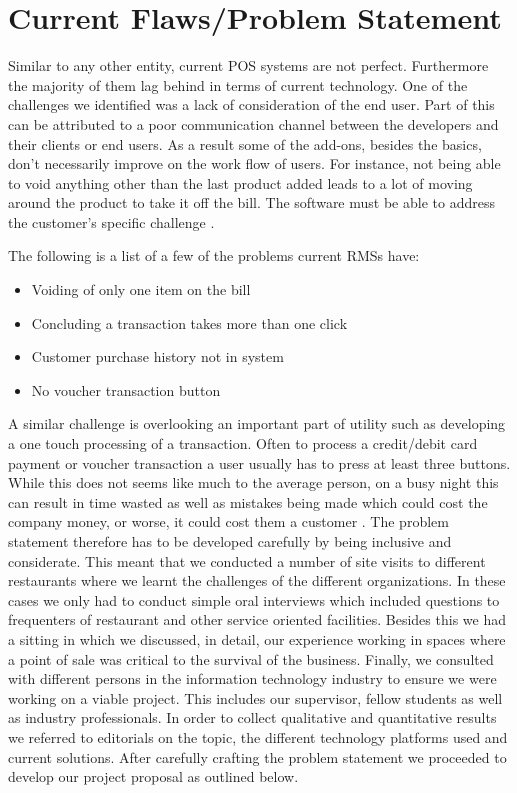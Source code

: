 \section{Current Flaws/Problem Statement}

Similar to any other entity, current POS systems are not perfect. Furthermore the majority of them lag behind in terms of current technology. One of the challenges we identified was a lack of consideration of the end user. Part of this can be attributed to a poor communication channel between the developers and their clients or end users. As a result some of the add-ons, besides the basics, don’t necessarily improve on the work flow of users. For instance, not being able to void anything other than the last product added leads to a lot of moving around the product to take it off the bill. The software must be able to address the customer’s specific challenge \cite{UserExp}. \par

The following is a list of a few of the problems current RMSs have:

\begin{itemize}
  \item Voiding of only one item on the bill
  \item Concluding a transaction takes more than one click
  \item Customer purchase history not in system
  \item No voucher transaction button
\end{itemize}


A similar challenge is overlooking an important part of utility such as developing a one touch processing of a transaction. Often to process a credit/debit card payment or voucher transaction a user usually has to press at least three buttons. While this does not seems like much to the average person, on a busy night this can result in time wasted as well as mistakes being made which could cost the company money, or worse, it could cost them a customer \cite{IIE}.
\newline
\newline
The problem statement therefore has to be developed carefully by being inclusive and considerate. This meant that we conducted a number of site visits to different restaurants where we learnt the challenges of the different organizations. In these cases we only had to conduct simple oral interviews which included questions to frequenters of restaurant and other service oriented facilities. Besides this we had a sitting in which we discussed, in detail, our experience working in spaces where a point of sale was critical to the survival of the business.  
\newline
\newline
Finally, we consulted with different persons in the information technology industry to ensure we were working on a viable project. This includes our supervisor, fellow students as well as industry professionals. In order to collect qualitative and quantitative results we referred to editorials on the topic, the different technology platforms used and current solutions. After carefully crafting the problem statement we proceeded to develop our project proposal as outlined below.


